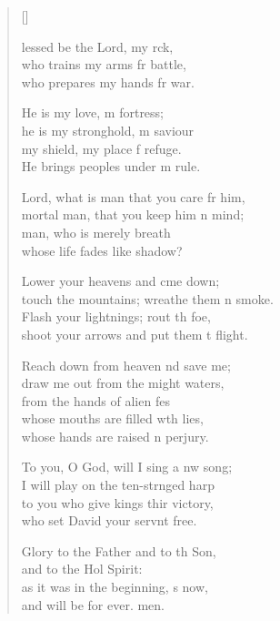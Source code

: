 \settowidth{\versewidth}{touch the mountains; wreathe them in smoke.}
\begin{verse}[\versewidth]
  \begin{patverse}
lessed be the Lord, my rck,\Flex\\
who trains my arms fr battle,\Med\\
who prepares my hands fr war.

He is my love, m fortress;\Med\\
he is my stronghold, m saviour\\
my shield, my place f refuge.\Med\\
He brings peoples under m rule.

Lord, what is man that you care fr him,\Med\\
mortal man, that you keep him \pointup{\i}n mind;\\
man, who is merely  breath\Med\\
whose life fades like  shadow?

Lower your heavens and cme down;\Med\\
touch the mountains; wreathe them \pointup{\i}n smoke.\\
Flash your lightnings; rout th foe,\Med\\
shoot your arrows and put them t flight.

Reach down from heaven nd save me;\Med\\
draw me out from the might waters,\\
from the hands of alien fes\Flex\\
whose mouths are filled w\pointup{\i}th lies,\Med\\
whose hands are raised \pointup{\i}n perjury.

To you, O God, will I sing a nw song;\Med\\
I will play on the ten-str\pointup{\i}nged harp\\
to you who give kings thir victory,\Med\\
who set David your servnt free.

Glory to the Father and to th Son,\Med\\
and to the Hol Spirit:\\
as it was in the beginning, \pointup{\i}s now,\Med\\
and will be for ever. men.
  \end{patverse}
\end{verse}
\setlength{\leftmargini}{\defleftmargini}  %
